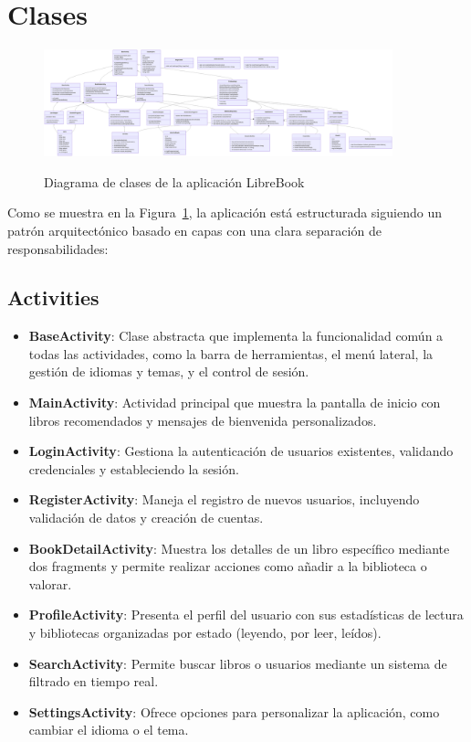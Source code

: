 \documentclass[a4paper,10pt]{report}
\begin{document}
    \section{Clases}
      \begin{figure}[H]
        \centering
        \href{https://raw.githubusercontent.com/Xabierland/DAS-Proyecto/refs/heads/main/Documentation/.img/diagrama-clases.svg}{%
          \includegraphics[width=0.9\textwidth]{.img/diagrama-clases.png} 
        }
        \caption{Diagrama de clases de la aplicación LibreBook}
        \label{fig:diagrama-clases}
      \end{figure}
      Como se muestra en la Figura~\ref{fig:diagrama-clases}, la aplicación está estructurada siguiendo un patrón arquitectónico basado en capas con una clara separación de responsabilidades\cite{android_architecture}:
      \subsection{Activities}
      \begin{itemize}
        \item \textbf{BaseActivity}: Clase abstracta que implementa la funcionalidad común a todas las actividades, como la barra de herramientas, el menú lateral, la gestión de idiomas y temas, y el control de sesión.
        \item \textbf{MainActivity}: Actividad principal que muestra la pantalla de inicio con libros recomendados y mensajes de bienvenida personalizados.
        \item \textbf{LoginActivity}: Gestiona la autenticación de usuarios existentes, validando credenciales y estableciendo la sesión.
        \item \textbf{RegisterActivity}: Maneja el registro de nuevos usuarios, incluyendo validación de datos y creación de cuentas.
        \item \textbf{BookDetailActivity}: Muestra los detalles de un libro específico mediante dos fragments y permite realizar acciones como añadir a la biblioteca o valorar.
        \item \textbf{ProfileActivity}: Presenta el perfil del usuario con sus estadísticas de lectura y bibliotecas organizadas por estado (leyendo, por leer, leídos).
        \item \textbf{SearchActivity}: Permite buscar libros o usuarios mediante un sistema de filtrado en tiempo real.
        \item \textbf{SettingsActivity}: Ofrece opciones para personalizar la aplicación, como cambiar el idioma o el tema.
      \end{itemize}
\end{document}
